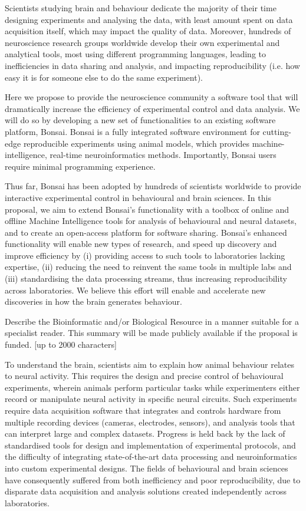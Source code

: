 Scientists studying brain and behaviour dedicate the majority of their time designing experiments and analysing the data, with least amount spent on data acquisition itself, which may impact the quality of data. Moreover, hundreds of neuroscience research groups worldwide develop their own experimental and analytical tools, most using different programming languages, leading to  inefficiencies in data sharing and analysis, and impacting reproducibility (i.e. how easy it is for someone else to do the same experiment). 

Here we propose to provide the neuroscience community a software tool that will dramatically increase the efficiency of experimental control and data analysis. We will do so by developing a new set of functionalities to an existing software platform, Bonsai. Bonsai is a fully integrated software environment for cutting-edge reproducible experiments using animal models, which provides machine-intelligence, real-time neuroinformatics methods. Importantly, Bonsai users require minimal programming experience. 

Thus far, Bonsai has been adopted by hundreds of scientists worldwide to provide interactive experimental control in behavioural and brain sciences. In this proposal, we aim to extend Bonsai’s functionality with a toolbox of online and offline Machine Intelligence tools for analysis of behavioural and neural datasets, and to create an open-access platform for software sharing. Bonsai’s enhanced functionality will enable new types of research, and speed up discovery and improve efficiency by (i) providing access to such tools to laboratories lacking expertise, (ii) reducing the need to reinvent the same tools in multiple labs and (iii) standardising the data processing streams, thus increasing reproducibility across laboratories. We believe this effort will enable and accelerate new discoveries in how the brain generates behaviour. 



Describe the Bioinformatic and/or Biological Resource in a manner suitable for a specialist reader. This summary will be made publicly available if the proposal is funded. [up to 2000 characters]

To understand the brain, scientists aim to explain how animal behaviour relates to neural activity. This requires the design and precise control of behavioural experiments, wherein animals perform particular tasks while experimenters either record or manipulate neural activity in specific neural circuits. Such experiments require data acquisition software that integrates and controls hardware from multiple recording devices (cameras, electrodes, sensors), and analysis tools that can interpret large and complex datasets. Progress is held back by the lack of standardised tools for design and implementation of experimental protocols, and the difficulty of integrating state-of-the-art data processing and neuroinformatics into custom experimental designs. The fields of behavioural and brain sciences have consequently suffered from both inefficiency and poor reproducibility, due to disparate data acquisition and analysis solutions created independently across laboratories.   

